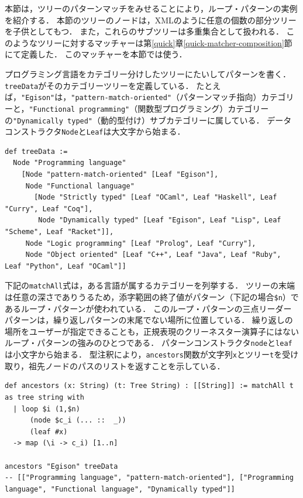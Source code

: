 本節は，ツリーのパターンマッチをみせることにより，ループ・パターンの実例を紹介する．
本節のツリーのノードは，XMLのように任意の個数の部分ツリーを子供としてもつ．
また，これらのサブツリーは多重集合として扱われる．
このようなツリーに対するマッチャーは第\ref{quick}章\ref{quick-matcher-composition}節にて定義した．
このマッチャーを本節では使う．

プログラミング言語をカテゴリー分けしたツリーにたいしてパターンを書く．
\lstinline{treeData}がそのカテゴリーツリーを定義している．
たとえば，\lstinline{"Egison"}は，\lstinline{"pattern-match-oriented"}（パターンマッチ指向）カテゴリーと，\lstinline{"Functional programming"}（関数型プログラミング）カテゴリーの\lstinline{"Dynamically typed"}（動的型付け）サブカテゴリーに属している．
データコンストラクタ\lstinline{Node}と\lstinline{Leaf}は大文字から始まる．
\begin{lstlisting}[language=egison,numbers=none]
def treeData :=
  Node "Programming language"
    [Node "pattern-match-oriented" [Leaf "Egison"],
     Node "Functional language"
       [Node "Strictly typed" [Leaf "OCaml", Leaf "Haskell", Leaf "Curry", Leaf "Coq"],
        Node "Dynamically typed" [Leaf "Egison", Leaf "Lisp", Leaf "Scheme", Leaf "Racket"]],
     Node "Logic programming" [Leaf "Prolog", Leaf "Curry"],
     Node "Object oriented" [Leaf "C++", Leaf "Java", Leaf "Ruby", Leaf "Python", Leaf "OCaml"]]
\end{lstlisting}

下記の\lstinline{matchAll}式は，ある言語が属するカテゴリーを列挙する．
ツリーの末端は任意の深さでありうるため，添字範囲の終了値がパターン（下記の場合\lstinline{$n}）であるループ・パターンが使われている．
このループ・パターンの三点リーダーパターンは，繰り返しパターンの末尾でない場所に位置している．
繰り返しの場所をユーザーが指定できることも，正規表現のクリーネスター演算子にはないループ・パターンの強みのひとつである．
パターンコンストラクタ\lstinline{node}と\lstinline{leaf}は小文字から始まる．
型注釈により，\lstinline{ancestors}関数が文字列\lstinline{x}とツリー\lstinline{t}を受け取り，祖先ノードのパスのリストを返すことを示している．
\begin{lstlisting}[language=egison,numbers=none]
def ancestors (x: String) (t: Tree String) : [[String]] := matchAll t as tree string with
  | loop $i (1,$n)
      (node $c_i (... ::  _))
      (leaf #x)
  -> map (\i -> c_i) [1..n]

ancestors "Egison" treeData
-- [["Programming language", "pattern-match-oriented"], ["Programming language", "Functional language", "Dynamically typed"]]
\end{lstlisting}

